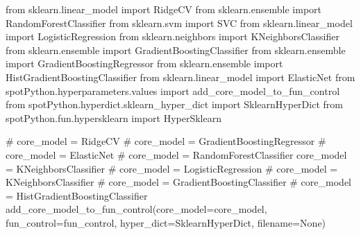 \documentclass[
  letterpaper,
  DIV=11,
  numbers=noendperiod]{scrreprt}
\newenvironment{Shaded}{\begin{snugshade}}{\end{snugshade}}
\newcommand{\CommentTok}[1]{\textcolor[rgb]{0.37,0.37,0.37}{#1}}
\newcommand{\ImportTok}[1]{\textcolor[rgb]{0.00,0.46,0.62}{#1}}
\newcommand{\NormalTok}[1]{\textcolor[rgb]{0.00,0.23,0.31}{#1}}
\newcommand{\OperatorTok}[1]{\textcolor[rgb]{0.37,0.37,0.37}{#1}}
\newcommand{\VariableTok}[1]{\textcolor[rgb]{0.07,0.07,0.07}{#1}}
\begin{document}
\begin{Shaded}
\begin{Highlighting}[]
\ImportTok{from}\NormalTok{ sklearn.linear\_model }\ImportTok{import}\NormalTok{ RidgeCV}
\ImportTok{from}\NormalTok{ sklearn.ensemble }\ImportTok{import}\NormalTok{ RandomForestClassifier}
\ImportTok{from}\NormalTok{ sklearn.svm }\ImportTok{import}\NormalTok{ SVC}
\ImportTok{from}\NormalTok{ sklearn.linear\_model }\ImportTok{import}\NormalTok{ LogisticRegression}
\ImportTok{from}\NormalTok{ sklearn.neighbors }\ImportTok{import}\NormalTok{ KNeighborsClassifier}
\ImportTok{from}\NormalTok{ sklearn.ensemble }\ImportTok{import}\NormalTok{ GradientBoostingClassifier}
\ImportTok{from}\NormalTok{ sklearn.ensemble }\ImportTok{import}\NormalTok{ GradientBoostingRegressor}
\ImportTok{from}\NormalTok{ sklearn.ensemble }\ImportTok{import}\NormalTok{ HistGradientBoostingClassifier}
\ImportTok{from}\NormalTok{ sklearn.linear\_model }\ImportTok{import}\NormalTok{ ElasticNet}
\ImportTok{from}\NormalTok{ spotPython.hyperparameters.values }\ImportTok{import}\NormalTok{ add\_core\_model\_to\_fun\_control}
\ImportTok{from}\NormalTok{ spotPython.hyperdict.sklearn\_hyper\_dict }\ImportTok{import}\NormalTok{ SklearnHyperDict}
\ImportTok{from}\NormalTok{ spotPython.fun.hypersklearn }\ImportTok{import}\NormalTok{ HyperSklearn}
\end{Highlighting}
\end{Shaded}

\begin{Shaded}
\begin{Highlighting}[]
\CommentTok{\# core\_model  = RidgeCV}
\CommentTok{\# core\_model = GradientBoostingRegressor}
\CommentTok{\# core\_model = ElasticNet}
\CommentTok{\# core\_model = RandomForestClassifier}
\NormalTok{core\_model }\OperatorTok{=}\NormalTok{ KNeighborsClassifier}
\CommentTok{\# core\_model = LogisticRegression}
\CommentTok{\# core\_model = KNeighborsClassifier}
\CommentTok{\# core\_model = GradientBoostingClassifier}
\CommentTok{\# core\_model = HistGradientBoostingClassifier}
\NormalTok{add\_core\_model\_to\_fun\_control(core\_model}\OperatorTok{=}\NormalTok{core\_model,}
\NormalTok{                              fun\_control}\OperatorTok{=}\NormalTok{fun\_control,}
\NormalTok{                              hyper\_dict}\OperatorTok{=}\NormalTok{SklearnHyperDict,}
\NormalTok{                              filename}\OperatorTok{=}\VariableTok{None}\NormalTok{)}
\end{Highlighting}
\end{Shaded}
\end{document}
